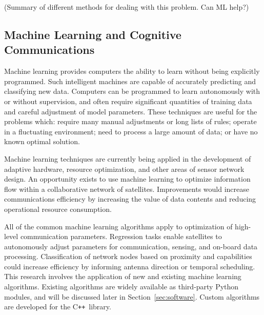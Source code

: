 \documentclass[conference]{IEEEtran}
\newcommand{\cpp}{C\texttt{++}~}
\begin{document}
{\color{red} (Summary of different methods for dealing with this problem. Can ML help?)}

\subsection{Machine Learning and Cognitive Communications}
\label{ssec:ml}

Machine learning provides computers the ability to learn without being
explicitly programmed.  Such intelligent machines are capable of accurately
predicting and classifying new data.  Computers can be programmed to learn
autonomously with or without supervision, and often require significant
quantities of training data and careful adjustment of model parameters.  These
techniques are useful for the problems which: require many manual adjustments or
long lists of rules; operate in a fluctuating environment; need to process a
large amount of data; or have no known optimal solution.

Machine learning techniques are currently being applied in the development of
adaptive hardware, resource optimization, and other areas of sensor network
design.  An opportunity exists to use machine learning to optimize information
flow within a collaborative network of satellites.  Improvements would increase
communications efficiency by increasing the value of data contents and reducing
operational resource consumption.

All of the common machine learning algorithms apply to optimization of
high-level communication parameters.  Regression tasks enable satellites to
autonomously adjust parameters for communication, sensing, and on-board data
processing.  Classification of network nodes based on proximity and capabilities
could increase efficiency by informing antenna direction or temporal scheduling.
This research involves the application of new and existing machine learning
algorithms.  Existing algorithms are widely available as third-party Python
modules, and will be discussed later in Section~\ref{sec:software}.  Custom
algorithms are developed for the \cpp library.


\end{document}
